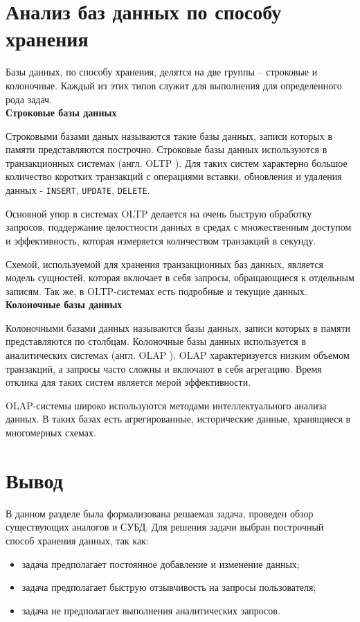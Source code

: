 \section{Анализ баз данных по способу хранения}

Базы данных, по способу хранения, делятся на две группы -- строковые и колоночные. Каждый из этих типов служит для выполнения для определенного рода задач. \\

\noindent\textbf{Строковые базы данных}

Строковыми базами даных называются такие базы данных, записи которых в памяти представляются построчно. Строковые базы данных используются в транзакционных системах (англ. OLTP \cite{OLTP}). Для таких систем характерно большое количество коротких транзакций с операциями вставки, обновления и удаления данных - \texttt{INSERT}, \texttt{UPDATE}, \texttt{DELETE}. 

Основной упор в системах OLTP делается на очень быструю обработку запросов, поддержание целостности данных в средах с множественным доступом и эффективность, которая измеряется количеством транзакций в секунду. 

Схемой, используемой для хранения транзакционных баз данных, является модель сущностей, которая включает в себя запросы, обращающиеся к отдельным записям. Так же, в OLTP-системах есть подробные и текущие данных.\\

\noindent\textbf{Колоночные базы данных}

Колоночными базами данных называются базы данных, записи которых в памяти представляются по столбцам. Колоночные базы данных используется в аналитических системах (англ. OLAP \cite{olap}). OLAP характеризуется низким объемом транзакций, а запросы часто сложны и включают в себя агрегацию. Время отклика для таких систем является мерой эффективности.

OLAP-системы широко используются методами интеллектуального анализа данных. В таких базах есть агрегированные, исторические данные, хранящиеся в многомерных схемах. 

\section{Вывод}
В данном разделе была формализована решаемая задача, проведен обзор существующих аналогов и СУБД. Для решения задачи выбран построчный способ хранения данных, так как:

\begin{itemize}
	\item задача предполагает постоянное добавление и изменение данных;
	\item задача предполагает быструю отзывчивость на запросы пользователя;
	\item задача не предполагает выполнения аналитических запросов.
\end{itemize}

